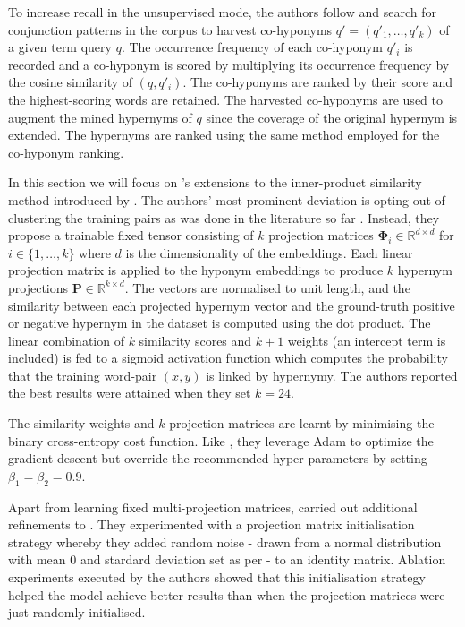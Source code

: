 To increase recall in the unsupervised mode, the authors follow \citep{Snow2004, ritter2009anyway} and search for conjunction patterns in the corpus to harvest co-hyponyms $q'=(q'_1,\ldots,q'_k )$ of a given term query $q$.  The occurrence frequency of each co-hyponym $q'_i$ is recorded and a co-hyponym is scored by multiplying its occurrence frequency by the cosine similarity of $(q, q'_i)$.  The co-hyponyms are ranked by their score and the highest-scoring words are retained.  The harvested co-hyponyms are used to augment the mined hypernyms of $q$ since the coverage of the original hypernym is extended.  The hypernyms are ranked using the same method employed for the co-hyponym ranking.

In this section we will focus on \citeauthor{bernier2018crim}'s extensions to the inner-product similarity method introduced by \citet{yamane2016distributional}.  The authors’ most prominent deviation is opting out of clustering the training pairs as was done in the literature so far \citep{Fu2014, espinosa2016supervised, yamane2016distributional}.  Instead, they propose a trainable fixed tensor consisting of $k$ projection matrices $\bm{\Phi}_i \in \mathbb{R}^{d \times d}$ for $i \in \{1,\ldots,k\}$ where $d$ is the dimensionality of the embeddings.  Each linear projection matrix is applied to the hyponym embeddings to produce $k$ hypernym projections $\bm{P} \in \mathbb{R}^{k \times d}$.  The vectors are normalised to unit length, and the similarity between each projected hypernym vector and the ground-truth positive or negative hypernym in the dataset is computed using the dot product.  The linear combination of $k$ similarity scores and $k+1$ weights (an intercept term is included) is fed to a sigmoid activation function which computes the probability that the training word-pair $(x,y)$ is linked by hypernymy.  The authors reported the best results were attained when they set $k=24$.  

The similarity weights and $k$ projection matrices are learnt by minimising the binary cross-entropy cost function.  Like \citet{yamane2016distributional}, they leverage Adam \citep{kingma2014adam} to optimize the gradient descent but override the recommended hyper-parameters by setting $\beta_1 = \beta_2 = 0.9$.

Apart from learning fixed multi-projection matrices, \citeauthor{bernier2018crim} carried out additional refinements to \citep{yamane2016distributional}.  They experimented with a projection matrix initialisation strategy whereby they added random noise - drawn from a normal distribution with mean 0 and stardard deviation set as per \citep{glorot2010understanding} - to an identity matrix.  Ablation experiments executed by the authors showed that this initialisation strategy helped the model achieve better results than when the projection matrices were just randomly initialised.

